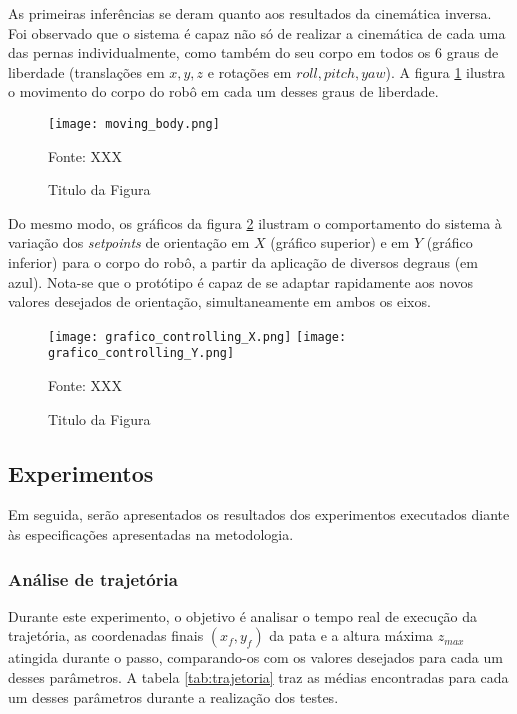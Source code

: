 \documentclass[../main.tex]{subfiles}
\begin{document}
  As primeiras inferências se deram quanto aos resultados da cinemática inversa. Foi observado que o sistema é capaz não só de realizar a cinemática de cada uma das pernas individualmente, como também do seu corpo em todos os 6 graus de liberdade (translações em $x, y, z$ e rotações em $roll, pitch, yaw$). A figura \ref{fig:moving_body} ilustra o movimento do corpo do robô em cada um desses graus de liberdade.

  \begin{figure}[h]
    \centering
    \caption{Titulo da Figura}
    \texttt{[image: moving\_body.png]}
    
    Fonte: XXX
    \label{fig:moving_body}
  \end{figure}

  Do mesmo modo, os gráficos da figura \ref{fig:grafico_controlling} ilustram o comportamento do sistema à variação dos \textit{setpoints} de orientação em $X$ (gráfico superior) e em $Y$ (gráfico inferior) para o corpo do robô, a partir da aplicação de diversos degraus (em azul). Nota-se que o protótipo é capaz de se adaptar rapidamente aos novos valores desejados de orientação, simultaneamente em ambos os eixos.

  \begin{figure}[h]
    \centering
    \caption{Titulo da Figura}
    \texttt{[image: grafico\_controlling\_X.png]}
    \texttt{[image: grafico\_controlling\_Y.png]}
    
    Fonte: XXX
    \label{fig:grafico_controlling}
  \end{figure}

  \subsection{Experimentos}
  Em seguida, serão apresentados os resultados dos experimentos executados diante às especificações apresentadas na metodologia.

  \subsubsection{Análise de trajetória}
  Durante este experimento, o objetivo é analisar o tempo real de execução da trajetória, as coordenadas finais $(x_f, y_f)$ da pata e a altura máxima $z_{max}$ atingida durante o passo, comparando-os com os valores desejados para cada um desses parâmetros. A tabela \ref{tab:trajetoria} traz as médias encontradas para cada um desses parâmetros durante a realização dos testes.
\end{document}
